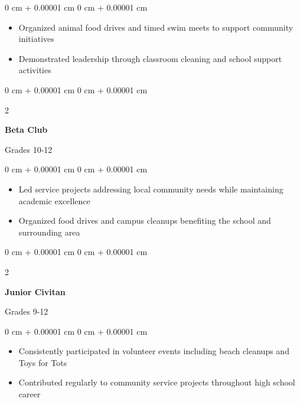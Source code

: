 \documentclass[10pt, letterpaper]{article}
\newenvironment{highlights}{
    \begin{itemize}[
        topsep=0.10 cm,
        parsep=0.10 cm,
        partopsep=0pt,
        itemsep=0pt,
        leftmargin=0 cm + 10pt
    ]
}{
    \end{itemize}
}
\newenvironment{onecolentry}{
    \begin{adjustwidth}{
        0 cm + 0.00001 cm
    }{
        0 cm + 0.00001 cm
    }
}{
    \end{adjustwidth}
}
\newenvironment{twocolentry}[2][]{
    \onecolentry
    \def\secondColumn{#2}
    \setcolumnwidth{\fill, 4.5 cm}
    \begin{paracol}{2}
}{
    \switchcolumn \raggedleft \secondColumn
    \end{paracol}
    \endonecolentry
}
\begin{document}
\vspace{0.10 cm}
\begin{onecolentry}
    \begin{highlights}
        \item Organized animal food drives and timed swim meets to support community initiatives
        \item Demonstrated leadership through classroom cleaning and school support activities
    \end{highlights}
\end{onecolentry}

\vspace{0.2 cm}

\begin{twocolentry}{
    Grades 10-12
}
    \textbf{Beta Club}
\end{twocolentry}

\vspace{0.10 cm}
\begin{onecolentry}
    \begin{highlights}
        \item Led service projects addressing local community needs while maintaining academic excellence
        \item Organized food drives and campus cleanups benefiting the school and surrounding area
    \end{highlights}
\end{onecolentry}

\vspace{0.2 cm}

\begin{twocolentry}{
    Grades 9-12
}
    \textbf{Junior Civitan}
\end{twocolentry}

\vspace{0.10 cm}
\begin{onecolentry}
    \begin{highlights}
        \item Consistently participated in volunteer events including beach cleanups and Toys for Tots
        \item Contributed regularly to community service projects throughout high school career
    \end{highlights}
\end{onecolentry}
\end{document}
